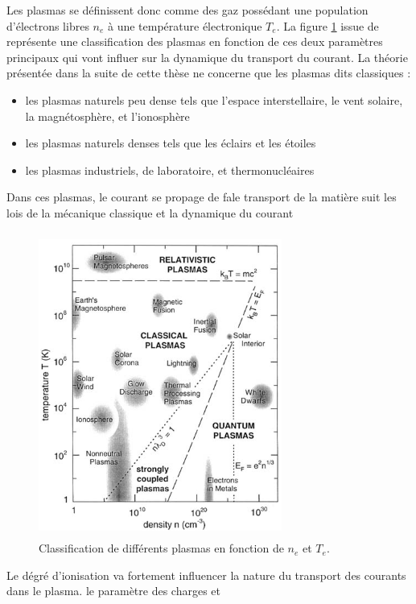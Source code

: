 			Les plasmas se définissent donc comme des gaz possédant une population
			d'électrons libres $n_e$ à une température électronique $T_e$. 
			La figure \ref{zoologie} issue de \cite{national1995Plasma}
			représente une classification des plasmas en fonction de ces deux paramètres 
			principaux qui vont influer sur la dynamique du transport du courant.
			La théorie présentée dans la suite de cette thèse ne concerne que les plasmas
			dits classiques :
			\begin{itemize}
			  \item les plasmas naturels peu dense tels que l'espace interstellaire,
			  le vent solaire, la magnétosphère, et l'ionosphère
			  \item les plasmas naturels denses tels que les éclairs et les étoiles
			  \item les plasmas industriels, de laboratoire, et thermonucléaires
			\end{itemize}
			Dans ces plasmas, le courant se propage de fale transport de la matière suit
			les lois de la mécanique classique et la dynamique du courant \begin{figure}[h]
				\centering
				\includegraphics[height=100mm,width=80mm]{figures/zoologie.png}{\caption{Classification
				de différents plasmas en fonction de $n_e$ et $T_e$.}\label{zoologie}}
			\end{figure}
			
			
			
			Le dégré d'ionisation va fortement influencer la nature du transport des courants dans le plasma.
			le paramètre des charges et 
			  
